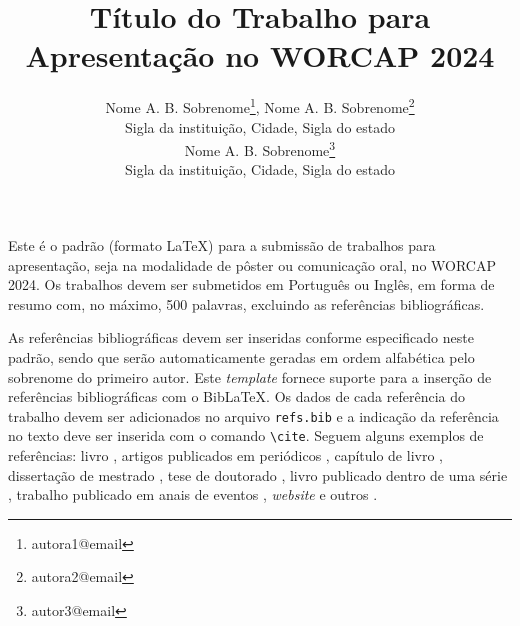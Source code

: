 \documentclass{worcap}
\begin{document}

\title{Título do Trabalho para Apresentação no WORCAP 2024}

\author{
    {\large Nome A. B. Sobrenome}\thanks{autora1@email}, {\large Nome A. B. Sobrenome}\thanks{autora2@email}\\
    {\small Sigla da instituição, Cidade, Sigla do estado} \\
    {\large Nome A. B. Sobrenome}\thanks{autor3@email}  \\
    {\small Sigla da instituição, Cidade, Sigla do estado} \\
}
\criartitulo



Este é o padrão (formato \LaTeX{}) para a submissão de trabalhos para apresentação, seja na modalidade de pôster ou comunicação oral, no WORCAP 2024. Os trabalhos devem ser submetidos em Português ou Inglês, em forma de resumo com, no máximo, 500 palavras, excluindo as referências bibliográficas.

As referências bibliográficas devem ser inseridas conforme especificado neste padrão, sendo que serão automaticamente geradas em ordem alfabética pelo sobrenome do primeiro autor. Este {\it template} fornece suporte para a inserção de referências bibliográficas com o Bib\LaTeX{}. Os dados de cada referência do trabalho devem ser adicionados no arquivo \verb+refs.bib+ e a indicação da referência no texto deve ser inserida com o comando \verb+\cite+. Seguem alguns exemplos de referências: livro \cite{Boldrini}, artigos publicados em periódicos \cite{Contiero,Cuminato}, capítulo de livro \cite{daSilva}, dissertação de mestrado \cite{Diniz}, tese de doutorado \cite{Mallet}, livro publicado dentro de uma série \cite{Gomes}, trabalho publicado em anais de eventos \cite{Santos}, {\it website} e outros \cite{CNMAC}.

\printbibliography
\end{document}
